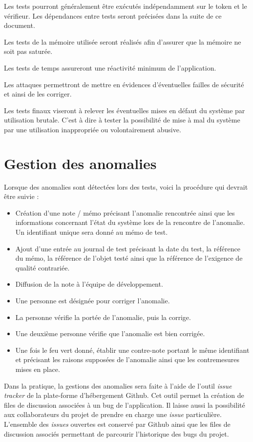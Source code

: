 \documentclass{"../../res/univ-projet"}
\begin{document}
  Les tests pourront généralement être exécutés indépendamment sur le token et le vérifieur. Les dépendances entre tests seront précisées dans la suite de ce document.
  
  Les tests de la mémoire utilisée seront réalisés afin d'assurer que la mémoire ne soit pas saturée.
  
  Les tests de temps assureront une réactivité minimum de l'application.
  
  Les attaques permettront de mettre en évidences d'éventuelles failles de sécurité et ainsi de les corriger.
  
  Les tests finaux viseront à relever les éventuelles mises en défaut du système par utilisation brutale. C'est à dire à tester la possibilité de mise à mal du système par une utilisation inappropriée ou volontairement abusive.
  
  \section{Gestion des anomalies}
  Lorsque des anomalies sont détectées lors des tests, voici la procédure qui devrait être suivie :
  \begin{itemize}
   \item Création d'une note / mémo précisant l'anomalie rencontrée ainsi que les informations concernant l'état du système lors de la rencontre de l'anomalie. Un 
   identifiant unique sera donné au mémo de test.
   \item Ajout d'une entrée au journal de test précisant la date du test, la référence du mémo, la référence de l'objet testé ainsi que la référence de l'exigence de 
   qualité contrariée.
   \item Diffusion de la note à l'équipe de développement.
   \item Une personne est désignée pour corriger l'anomalie.
   \item La personne vérifie la portée de l'anomalie, puis la corrige.
   \item Une deuxième personne vérifie que l'anomalie est bien corrigée.
   \item Une fois le feu vert donné, établir une contre-note portant le même identifiant et précisant les raisons supposées 
   de l'anomalie ainsi que les contremesures mises en place.
  \end{itemize}
  
  Dans la pratique, la gestions des anomalies sera faite à l'aide de l'outil \emph{issue tracker} de
  la plate-forme d'hébergement Github. Cet outil permet la création de files de discussion associées à un bug
  de l'application. Il laisse aussi la possibilité aux collaborateurs du projet de prendre en charge 
  une \emph{issue} particulière. L'ensemble des \emph{issues} ouvertes est conservé par Github ainsi
  que les files de discussion associés permettant de parcourir l'historique des bugs du projet.
\end{document}

